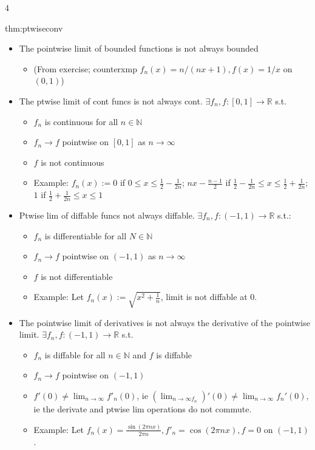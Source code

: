 \documentclass[landscape, 8pt]{extarticle}
\begin{document}
\begin{multicols*}{4}
		
		\begin{thm}{thm:ptwiseconv}{ }
		\begin{itemize}[label=*]
			\item The pointwise limit of bounded functions is not always bounded
			\begin{itemize}
				\item (From exercise; counterxmp $f_n(x) = n/(nx + 1), f(x) = 1/x$ on $(0,1)$)
			\end{itemize}
			\item The ptwise limit of cont funcs is not always cont. $\exists f_n, f: [0,1] \to \mathbb{R}$ s.t.
			\begin{itemize}
				\item $f_n$ is continuous for all $n \in \mathbb{N}$
				\item $f_n \to f$ pointwise on $[0, 1]$ as $n \to \infty$
				\item $f$ is not continuous
				\item Example: $f_n(x) := 0$ if $ 0 \le x \le \frac{1}{2} - \frac{1}{2n}$; $nx - \frac{n-1}{2}$ if $ \frac{1}{2} - \frac{1}{2n} \le x \le \frac{1}{2}+ \frac{1}{2n}$; $1$ if $\frac{1}{2} + \frac{1}{2n} \le x \le 1$
			\end{itemize}
			\item Ptwise lim of diffable funcs not always diffable. $\exists f_n, f: (-1, 1) \to \mathbb{R}$ s.t.:
			\begin{itemize}
				\item $f_n$ is differentiable for all $N \in \mathbb{N}$
				\item $f_n \to f$ pointwise on $(-1, 1)$ as $n \to \infty$
				\item $f$ is not differentiable
				\item Example: Let $f_n(x) := \sqrt{x^2 + \frac{1}{n}}$, limit is not diffable at $0$.
			\end{itemize}
			\item The pointwise limit of derivatives is not always the derivative of the pointwise limit. $\exists f_n, f : (-1, 1) \to \mathbb{R}$ s.t.
			\begin{itemize}
				\item $f_n$ is diffable for all $n \in \mathbb{N}$ and $f$ is diffable
				\item $f_n \to f$ pointwise on $(-1, 1)$
				\item $f'(0) \ne \lim_{n\to \infty}f'_n(0)$, ie $\left(\lim_{n\to \infty f_n}\right)'(0) \ne \lim_{n\to \infty}f_n'(0)$, ie the derivate and ptwise lim operations do not commute.
				\item Example: Let $f_n(x) = \frac{\sin(2 \pi n x)}{2 \pi n}, f'_n = \cos(2\pi n x), f = 0$ on $(-1, 1)$.
			\end{itemize}
		\end{itemize}
		

\end{thm}
\end{multicols*}
\end{document}

